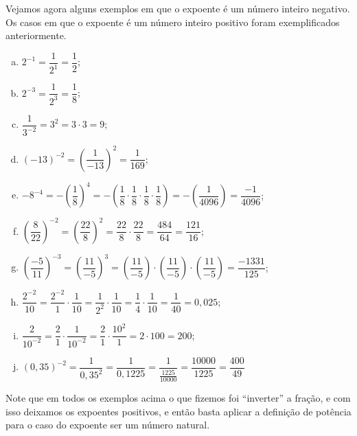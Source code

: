  \vskip0.3cm

 \begin{exem}
 Vejamos agora alguns exemplos em que o expoente é um número inteiro negativo. Os casos em que o expoente é um número inteiro positivo foram exemplificados anteriormente.

 \begin{enumerate}[a)]
  \item $2^{-1}= \dfrac{1}{2^{1}}= \dfrac{1}{2}$;
  \item $2^{-3}= \dfrac{1}{2^3}= \dfrac{1}{8}$;
  \item $\dfrac{1}{3^{-2}}= 3^2= 3 \cdot 3= 9$;
  \item $(-13)^{-2}= \left( \dfrac{1}{-13} \right)^{2}= \dfrac{1}{169}$;
  \item $-8^{-4}= -\left( \dfrac{1}{8} \right)^{4}= -\left( \dfrac{1}{8} \cdot \dfrac{1}{8} \cdot \dfrac{1}{8} \cdot \dfrac{1}{8} \right)= -\left( \dfrac{1}{4096} \right)= \dfrac{-1}{4096}$;
  \item $\left( \dfrac{8}{22} \right)^{-2}= \left( \dfrac{22}{8} \right)^{2}= \dfrac{22}{8} \cdot \dfrac{22}{8}= \dfrac{484}{64}= \dfrac{121}{16}$;
  \item $\left( \dfrac{-5}{11} \right)^{-3}= \left( \dfrac{11}{-5} \right)^{3}= \left( \dfrac{11}{-5} \right) \cdot \left( \dfrac{11}{-5} \right) \cdot \left( \dfrac{11}{-5} \right)= \dfrac{-1331}{125}$;
  \item $\dfrac{2^{-2}}{10}= \dfrac{2^{-2}}{1} \cdot \dfrac{1}{10}= \dfrac{1}{2^{2}} \cdot \dfrac{1}{10}= \dfrac{1}{4} \cdot \dfrac{1}{10}= \dfrac{1}{40}= 0,025$;
  \item $\dfrac{2}{10^{-2}}= \dfrac{2}{1} \cdot \dfrac{1}{10^{-2}}= \dfrac{2}{1} \cdot \dfrac{10^{2}}{1}= 2 \cdot 100= 200$;
  \item $(0,35)^{-2}= \dfrac{1}{0,35^{2}}= \dfrac{1}{0,1225}= \dfrac{1}{\frac{1225}{10000}}= \dfrac{10000}{1225}= \dfrac{400}{49}$
 \end{enumerate}

 \end{exem}

 Note que em todos os exemplos acima o que fizemos foi ``inverter'' a fração, e com isso deixamos os expoentes positivos, e então basta aplicar a definição de potência para o caso do expoente ser um número natural.

